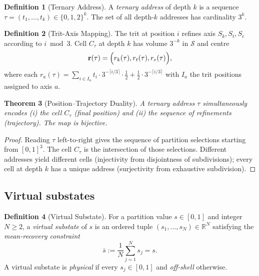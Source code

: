 \documentclass[twocolumn,10pt,a4paper]{article}
\theoremstyle{thmstyle}
\newtheorem{theorem}{Theorem}[section]
\theoremstyle{definition}
\newtheorem{definition}[theorem]{Definition}
\theoremstyle{remark}
\newcommand{\R}{\mathbb{R}}
\newcommand{\Sspace}{\mathcal{S}}
\begin{document}
\begin{definition}[Ternary Address]
\label{def:ternary}
A \emph{ternary address} of depth $k$ is a sequence
$\tau=(t_{1},\ldots,t_{k})\in\{0,1,2\}^{k}$. The set of all
depth-$k$ addresses has cardinality $3^{k}$.
\end{definition}

\begin{definition}[Trit-Axis Mapping]
\label{def:trit}
The trit at position $i$ refines axis $S_{k},S_{t},S_{e}$ according
to $i\bmod 3$. Cell $C_{\tau}$ at depth $k$ has volume $3^{-k}$ in
$\Sspace$ and centre
\begin{equation}
\mathbf{r}(\tau)=\Bigl(r_{k}(\tau),r_{t}(\tau),r_{e}(\tau)\Bigr),
\label{eq:rcell}
\end{equation}
where each $r_{a}(\tau)=\sum_{i\in I_{a}}t_{i}\cdot 3^{-\lceil
i/3\rceil}\cdot \tfrac{1}{2}+\tfrac{1}{2}\cdot 3^{-\lceil i/3\rceil}$
with $I_{a}$ the trit positions assigned to axis $a$.
\end{definition}

\begin{theorem}[Position--Trajectory Duality]
\label{thm:dual}
A ternary address $\tau$ simultaneously encodes (i) the cell
$C_{\tau}$ (final position) and (ii) the sequence of refinements
(trajectory). The map is bijective.
\end{theorem}

\begin{proof}
Reading $\tau$ left-to-right gives the sequence of partition
selections starting from $[0,1]^{3}$. The cell $C_{\tau}$ is the
intersection of those selections. Different addresses yield
different cells (injectivity from disjointness of subdivisions); every
cell at depth $k$ has a unique address (surjectivity from exhaustive
subdivision).
\end{proof}

\subsection{Virtual substates}

\begin{definition}[Virtual Substate]
\label{def:virtual}
For a partition value $s\in[0,1]$ and integer $N\geq 2$, a
\emph{virtual substate} of $s$ is an ordered tuple
$(s_{1},\ldots,s_{N})\in\R^{N}$ satisfying the \emph{mean-recovery
constraint}
\begin{equation}
\bar s:=\frac{1}{N}\sum_{j=1}^{N}s_{j}=s.
\label{eq:meanrec}
\end{equation}
A virtual substate is \emph{physical} if every $s_{j}\in[0,1]$ and
\emph{off-shell} otherwise.
\end{definition}
\end{document}
